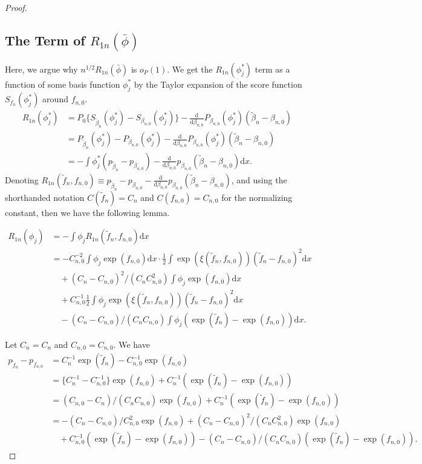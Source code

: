 \begin{proof}
\subsection*{The Term of $R_{1n}(\bar\phi)$}
Here, we argue why $n^{1/2}R_{1n}(\bar\phi)$ is $o_P(1)$.
We get the $R_{1n}(\phi_j^*)$ term as a function of some basis function $\phi_j^*$ by the Taylor expansion of the score function $S_{f_n}(\phi_j^*)$ around $f_{n,0}$.
\begin{align}
   R_{1n}(\phi_j^*) &= P_0 \{S_{\tilde \beta_n}(\phi_j^*) - S_{\beta_{n,0}}(\phi_j^*)\} - \frac{\mathrm{d}}{\mathrm{d}\beta_{n,0}}P_{\beta_{n,0}}(\phi_j^*)(\tilde \beta_n - \beta_{n,0}) \nonumber \\
   &= P_{\tilde \beta_n}(\phi_j^*) - P_{\beta_{n,0}}(\phi_j^*) - \frac{\mathrm{d}}{\mathrm{d}\beta_{n,0}}P_{\beta_{n,0}}(\phi_j^*)(\tilde \beta_n - \beta_{n,0}) \nonumber \\
   &= -\int \phi_j^* (p_{\tilde \beta_n} - p_{\beta_{n,0}}) - \frac{\mathrm{d}}{\mathrm{d}\beta_{n,0}}p_{\beta_{n,0}}(\tilde \beta_n - \beta_{n,0}) \mathrm{d}x.
\end{align}
Denoting $R_{1n}(\tilde{f}_n,f_{n,0}) \equiv p_{\tilde \beta_n} - p_{\beta_{n,0}} - \frac{\mathrm{d}}{\mathrm{d}\beta_{n,0}}p_{\beta_{n,0}}(\tilde \beta_n - \beta_{n,0})$, and using the shorthanded notation $C(\tilde f_n)=C_n$ and $C(f_{n,0})=C_{n,0}$ for the normalizing constant, then we have the following lemma.

\begin{lemma}\label{app_d_lemma:R1n_phi_j}
\begin{align*}
R_{1n}(\phi_j) &= - \int \phi_j R_{1n}(\tilde{f}_n,f_{n,0}) \mathrm{d}x\\
 &= -C_{n,0}^{-2}\int \phi_j \exp(f_{n,0})\mathrm{d}x \cdot \tfrac{1}{2} \int \exp(\xi(\tilde{f}_n,f_{n,0}))(\tilde{f}_n-f_{n,0})^2 \mathrm{d}x\\
 &\quad +(C_n-C_{n,0})^2/(C_nC_{n,0}^2)\int \phi_j \exp(f_{n,0}) \mathrm{d}x\\
 &\quad +C_{n,0}^{-1}\tfrac{1}{2}\int \phi_j \exp(\xi(\tilde{f}_n,f_{n,0}))(\tilde{f}_n-f_{n,0})^2\mathrm{d}x\\
 &\quad -(C_n-C_{n,0})/(C_nC_{n,0})\int \phi_j (\exp(\tilde{f}_n)-\exp(f_{n,0}))\mathrm{d}x .
\end{align*}
\end{lemma}

Let $C_n=C_n$ and $C_{n,0}=C_{n,0}$. 
We have
\begin{align*}
p_{\tilde{f}_n}-p_{f_{n,0}} 
 &= C_n^{-1}\exp(\tilde{f}_n)-C_{n,0}^{-1}\exp(f_{n,0})\\
 &= \{C_n^{-1}-C_{n,0}^{-1}\}\exp(f_{n,0})+C_n^{-1}(\exp(\tilde{f}_n)-\exp(f_{n,0}))\\
 &= (C_{n,0}-C_n)/(C_nC_{n,0}) \exp(f_{n,0})+C_n^{-1}(\exp(\tilde{f}_n)-\exp(f_{n,0}))\\
 &= - (C_n-C_{n,0})/C_{n,0}^2 \exp(f_{n,0})+(C_n-C_{n,0})^2/(C_nC_{n,0}^2)\exp(f_{n,0})\\
 &\quad + C_{n,0}^{-1}(\exp(\tilde{f}_n)-\exp(f_{n,0}))-(C_n-C_{n,0})/(C_nC_{n,0})(\exp(\tilde{f}_n)-\exp(f_{n,0})).
\end{align*}


\end{proof}
